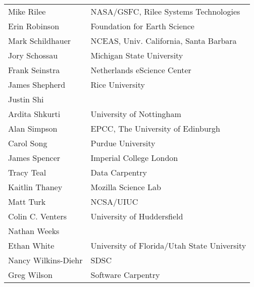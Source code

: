 \documentclass[11pt, oneside]{amsart}
\begin{document}
\begin{longtable}{ll}
Mike Rilee                    &  NASA/GSFC, Rilee Systems Technologies                                \\
Erin Robinson                 &  Foundation for Earth Science                                         \\
Mark Schildhauer              &  NCEAS, Univ. California, Santa Barbara                               \\
Jory Schossau                 &  Michigan State University                                            \\
Frank Seinstra                &  Netherlands eScience Center                                          \\
James Shepherd                &  Rice University                                                      \\
Justin Shi                    \\
Ardita Shkurti                &  University of Nottingham                                             \\
Alan Simpson                  &  EPCC, The University of Edinburgh                                    \\
Carol Song                    &  Purdue University                                                    \\
James Spencer                 &  Imperial College London                                              \\
Tracy Teal                    &  Data Carpentry                                                       \\
Kaitlin Thaney                &  Mozilla Science Lab                                                  \\
Matt Turk                     &  NCSA/UIUC                                                            \\
Colin C. Venters              &  University of Huddersfield                                           \\
Nathan Weeks                  \\
Ethan White                   &  University of Florida/Utah State University                          \\
Nancy Wilkins-Diehr           &  SDSC                                                                 \\
Greg Wilson                   &  Software Carpentry                                                   \\
\end{longtable}




\end{document}
